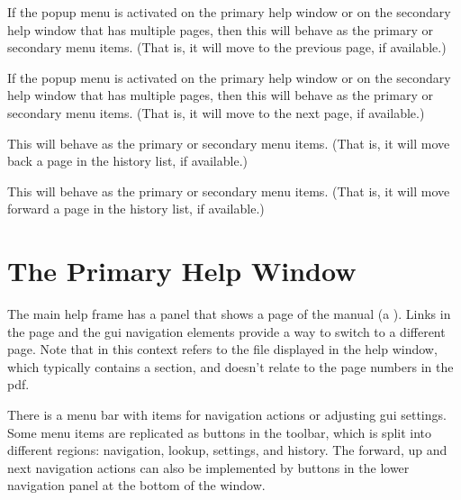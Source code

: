 
If the popup menu is activated on the primary help window or on the
secondary help window that has multiple pages, then this will behave
as the primary  or
secondary  menu items.
(That is, it will move to the previous page, if available.)


If the popup menu is activated on the primary help window or on the
secondary help window that has multiple pages, then this will behave
as the primary  or
secondary  menu items.
(That is, it will move to the next page, if available.)


This will behave as the primary
 or secondary
 menu items.
(That is, it will move back a page in the history list, if available.)


This will behave as the primary
 or secondary
 menu items.
(That is, it will move forward a page in the history list, if available.)


\section{The Primary Help Window}
\label{sec:primaryhelp}

The main help frame has a panel that shows a page of the manual (a
).  Links in the page and the \gls{gui} navigation
elements provide a way to switch to a different page.  Note that
 in this context refers to the file displayed in the help
window, which typically contains a section, and doesn't relate to
the page numbers in the \gls{pdf}.

There is a menu bar with items for navigation actions or adjusting
\gls{gui} settings. Some menu items are replicated as buttons in the
toolbar, which is split into different regions: navigation, lookup,
settings, and history. The forward, up and next navigation actions
can also be implemented by buttons in the lower navigation panel at
the bottom of the window.


